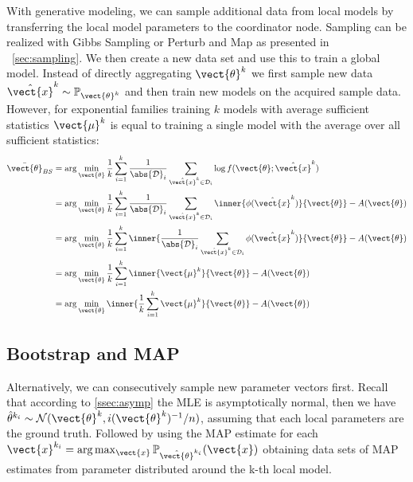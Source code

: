 With generative modeling, we can sample additional data from local models by transferring the local model parameters to the coordinator node.
Sampling can be realized with Gibbs Sampling or Perturb and Map as presented in \sect~\ref{sec:sampling}.
We then create a new data set and use this to train a  global model. 
Instead of directly aggregating $\vect{\theta}^k$ we first sample new data  $\hat{\vect{x}}^k \sim \mathbb{P}_{\vect{\theta}^k}$ and then train new models on the acquired sample data.
However, for exponential families training $k$ models with average sufficient statistics $\vect{\mu}^k$ is equal to training a single model with the average over all sufficient statistics:
\begin{equation}
    \begin{split}
        \bar{\vect{\theta}}_{BS} &= \arg\min_{\vect{\theta}} \frac{1}{k}\sum_{i=1}^k \frac{1}{\abs{\mathcal{D}}_i} \sum_{\hat{\vect{x}}^k \in \mathcal{D}_i} \log f(\vect{\theta}; \hat{\vect{x}}^k) \\
        &=  \arg\min_{\vect{\theta}} \frac{1}{k}\sum_{i=1}^k \frac{1}{\abs{\mathcal{D}}_i} \sum_{\hat{\vect{x}}^k \in \mathcal{D}_i} \inner{\phi(\hat{\vect{x}}^k)}{\vect{\theta}} - A(\vect{\theta}) \\
        &= \arg\min_{\vect{\theta}} \frac{1}{k}\sum_{i=1}^k \inner{\frac{1}{\abs{\mathcal{D}}_i} \sum_{\hat{\vect{x}}^k \in \mathcal{D}_i} \phi(\hat{\vect{x}}^k)}{\vect{\theta}} - A(\vect{\theta}) \\
        &= \arg\min_{\vect{\theta}} \frac{1}{k}\sum_{i=1}^k \inner{\vect{\mu}^k}{\vect{\theta}} - A(\vect{\theta}) \\
        & =  \arg\min_{\vect{\theta}} \inner{\frac{1}{k}\sum_{i=1}^k  \vect{\mu}^k}{\vect{\theta}} - A(\vect{\theta})
    \end{split}
\end{equation}

\subsection{Bootstrap and MAP}
Alternatively, we can consecutively sample new parameter vectors first.
Recall that according to \ref{ssec:asymp} the MLE is asymptotically normal, then we have $\hat{\theta}^{k_i}  \sim \mathcal{N}(\vect{\theta}^k, i(\vect{\theta}^k)^{-1}/n)$, assuming that each local parameters are the ground truth.
Followed by using the MAP estimate for each $\vect{x}^{k_i} = \arg\max_{\vect{x}} \mathbb{P}_{\hat{\vect{\theta}}^{k_i}}(\vect{x})$ obtaining data sets of MAP estimates from parameter distributed around the k-th local model.

